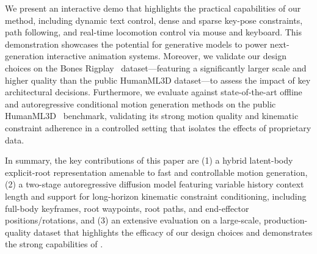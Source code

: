 We present an interactive demo that highlights the practical capabilities of our method, including dynamic text control, dense and sparse key-pose constraints, path following, and real-time locomotion control via mouse and keyboard. This demonstration showcases the potential for generative models to power next-generation interactive animation systems.
Moreover, we validate our design choices on the Bones Rigplay~\cite{BonesStudio2026} dataset—featuring a significantly larger scale and higher quality than the public HumanML3D dataset—to assess the impact of key architectural decisions.
Furthermore, we evaluate \method against state-of-the-art offline and autoregressive conditional motion generation methods on the public HumanML3D~\cite{guo2022humanml3d} benchmark, validating its strong motion quality and kinematic constraint adherence in a controlled setting that isolates the effects of proprietary data. 

In summary, the key contributions of this paper are (1) a hybrid latent-body explicit-root representation amenable to fast and controllable motion generation, (2) a two-stage autoregressive diffusion model featuring variable history context length and support for long-horizon kinematic constraint conditioning, including full-body keyframes, root waypoints, root paths, and end-effector positions/rotations, and (3) an extensive evaluation on a large-scale, production-quality dataset that highlights the efficacy of our design choices and demonstrates the strong capabilities of \method.






